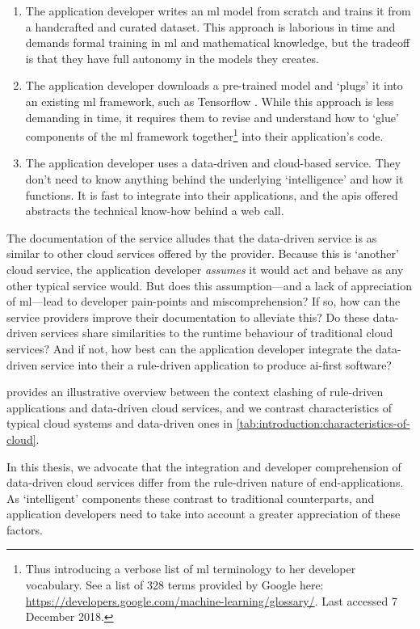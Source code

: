 \begin{enumerate}
  \item The application developer writes an \gls{ml} model from scratch and trains it from a handcrafted and curated dataset. This approach is laborious in time and demands formal training in \gls{ml} and mathematical knowledge, but the tradeoff is that they have full autonomy in the models they creates.
  \item The application developer downloads a pre-trained model and `plugs' it into an existing \gls{ml} framework, such as Tensorflow \citep{Abadi:2016vn}. While this approach is less demanding in time, it requires them to revise and understand how to `glue' components of the \gls{ml} framework together\footnote{Thus introducing a verbose list of \gls{ml} terminology to her developer vocabulary. See a list of 328 terms provided by Google here: \url{https://developers.google.com/machine-learning/glossary/}. Last accessed 7 December 2018.} into their application's code.
  \item The application developer uses a data-driven and cloud-based service. They don't need to know anything behind the underlying `intelligence' and how it functions. It is fast to integrate into their applications, and the \glspl{api} offered abstracts the technical know-how behind a web call.
\end{enumerate}

\noindent
The documentation of the service alludes that the data-driven service is as similar to other cloud services offered by the provider. 
Because this is `another' cloud service, the application developer \textit{assumes} it would act and behave as any other typical service would.
But does this assumption---and a lack of appreciation of \gls{ml}---lead to developer pain-points and miscomprehension?
If so, how can the service providers improve their documentation to alleviate this?
Do these data-driven services share similarities to the runtime behaviour of traditional cloud services?
And if not, how best can the application developer integrate the data-driven service into their a rule-driven application to produce \gls{ai}-first software?

 provides an illustrative overview between the context clashing of rule-driven applications and data-driven cloud services, and we contrast characteristics of typical cloud systems and data-driven ones in \cref{tab:introduction:characteristics-of-cloud}.

\begin{callout}
In this thesis, we advocate that the integration and developer comprehension of data-driven cloud services differ from the rule-driven nature of end-applications. As `intelligent' components these contrast to traditional counterparts, and application developers need to take into account a greater appreciation of these factors.
\end{callout}

